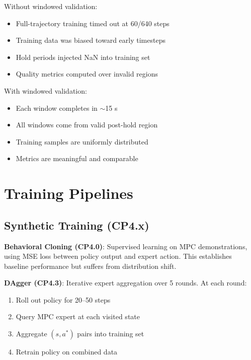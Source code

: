 \documentclass[conference]{IEEEtran}
\begin{document}
Without windowed validation:
\begin{itemize}
\item Full-trajectory training timed out at 60/640 steps
\item Training data was biased toward early timesteps
\item Hold periods injected NaN into training set
\item Quality metrics computed over invalid regions
\end{itemize}

With windowed validation:
\begin{itemize}
\item Each window completes in $\sim$15 s
\item All windows come from valid post-hold region
\item Training samples are uniformly distributed
\item Metrics are meaningful and comparable
\end{itemize}

\section{Training Pipelines}

\subsection{Synthetic Training (CP4.x)}

\textbf{Behavioral Cloning (CP4.0)}: Supervised learning on MPC demonstrations, using MSE loss between policy output and expert action. This establishes baseline performance but suffers from distribution shift.

\textbf{DAgger (CP4.3)}: Iterative expert aggregation over 5 rounds. At each round:
\begin{enumerate}
\item Roll out policy for 20--50 steps
\item Query MPC expert at each visited state
\item Aggregate $(s, a^*)$ pairs into training set
\item Retrain policy on combined data
\end{enumerate}
\end{document}

